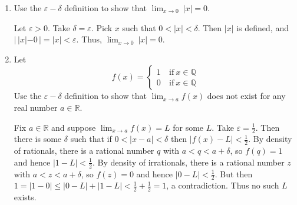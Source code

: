 \documentclass[12pt]{amsart}
\def\d{\delta}
\def\e{\varepsilon}
\newcommand{\Q}{\mathbb{Q}}
\newcommand{\R}{{\mathbb{R}}}
\numberwithin{equation}{section}
\theoremstyle{plain} %
\theoremstyle{definition}
\theoremstyle{remark}
\begin{document}
\begin{enumerate}

\item Use the $\e-\delta$ definition to show that $\lim_{x\to 0} \ |x| = 0$.

\begin{framed}
Let $\e>0$. Take $\d=\e$. Pick $x$ such that ${0<|x|<\d} $. Then $|x|$ is defined, and $|\, |x| - 0 \, | = |x| < \e$. Thus, $\lim_{x\to 0} \ |x| = 0$.
\end{framed}

\item Let \[f(x)= \begin{cases} 1 \ &\text{if} \ x\in \Q \\ 0 \ &\text{if} \ x\in \Q \end{cases}\]
Use the $\e-\delta$ definition to show that $\lim_{x\to a} f(x)$ does not exist for any real number $a\in \R$. 

\begin{framed}
Fix $a\in \R$ and suppose $\lim_{x\to a} f(x) = L$ for some $L$. Take $\e=\frac{1}{2}$. Then there is some $\d$ such that if {${0<|x-a|<\d}$} then $|f(x)-L|<\frac{1}{2}$. By density of rationals, there is a rational number $q$ with ${a<q<a+\d}$, so $f(q)=1$ and hence ${|1-L|}<\frac{1}{2}$. By density of irrationals, there is a rational number $z$ with ${a<z<a+\d}$, so $f(z)=0$ and hence ${|0-L|}<\frac{1}{2}$. But then $1=|1-0| \leq |0-L|+|1-L| < \frac12+\frac12 = 1$, a contradiction. Thus no such $L$ exists.
\end{framed}

\end{enumerate}
\end{document}
